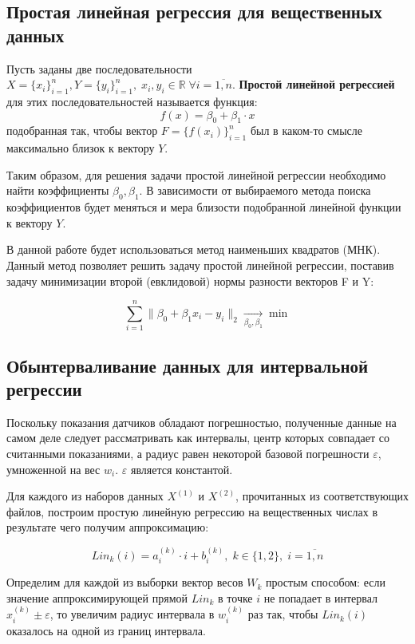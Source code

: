 \subsection{Простая линейная регрессия для вещественных данных}
Пусть заданы две последовательности $X = \{x_i\}_{i=1}^{n}, Y = \{y_i\}_{i=1}^{n}, \; x_i, y_i \in \mathbb{R} \; \forall i = \overline{1,n}$. \textbf{Простой линейной регрессией} для этих последовательностей называется функция:
\begin{equation}
f(x) = \beta_0 + \beta_1 \cdot x
\end{equation}
подобранная так, чтобы вектор $F = \{f(x_i)\}_{i=1}^{n}$ был в каком-то смысле максимально близок к вектору $Y$.

Таким образом, для решения задачи простой линейной регрессии необходимо найти коэффициенты $\beta_0, \beta_1$.
В зависимости от выбираемого метода поиска коэффициентов будет меняться и мера близости подобранной линейной функции к вектору $Y$.

В данной работе будет использоваться метод наименьших квадратов (МНК). Данный метод позволяет решить задачу простой линейной регрессии, поставив задачу минимизации
второй (евклидовой) нормы разности векторов F и Y:

\begin{equation}
\displaystyle \sum_{i=1}^{n} \|\beta_0 + \beta_1 x_i - y_i \|_2 \underset{\beta_0, \beta_1}{\longrightarrow} \min
\end{equation}

\subsection{Обынтерваливание данных для интервальной регрессии}
Поскольку показания датчиков обладают погрешностью, полученные данные на самом деле следует рассматривать как интервалы, центр которых совпадает со считанными показаниями, а радиус равен некоторой базовой погрешности $\varepsilon$, умноженной на вес $w_i$. $\varepsilon$ является константой.

Для каждого из наборов данных $X^{(1)}$ и $X^{(2)}$, прочитанных из соответствующих файлов, построим простую линейную регрессию на вещественных числах в результате чего получим аппроксимацию:

\begin{equation}
Lin_k(i) = a^{(k)}_i \cdot i + b^{(k)}_i, \; k \in \{1, 2\}, \; i=\overline{1,n}
\end{equation}

Определим для каждой из выборки вектор весов $W_k$ простым способом: если значение аппроксимирующей прямой $Lin_k$ в точке $i$ не попадает в интервал $x^{(k)}_i \pm \varepsilon$, то увеличим радиус интервала в $w^{(k)}_i$ раз так, чтобы $Lin_k(i)$ оказалось на одной из границ интервала.

